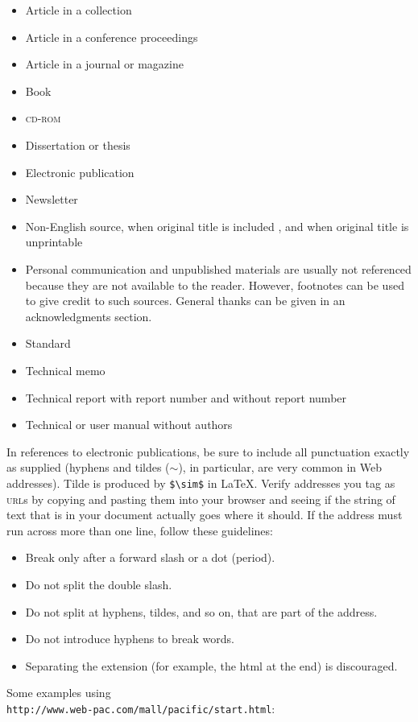 \begin{itemize}
\item
Article in a collection \cite{Albrecht81:PPIFTE}
\item
Article in a conference proceedings \cite{Weiser98:ICDE}
\item
Article in a journal or magazine \cite{SSS74:ACMCS}
\item
Book \cite{Arbib98,NS79}
\item
\textsc{cd-rom} \cite{NS79:CDROM}
\item
Dissertation or thesis \cite{Fagin87:PhD,Nichols85:MS}
\item
Electronic publication \cite{Burka00:MUD}
\item
Newsletter \cite{Butler87:SDN}
\item
Non-English source, 
when original title is included \cite{ZS84},
and when original title is unprintable \cite{Nakayama95:NE}
\item
Personal communication and
                 unpublished materials
are usually not referenced because they are not
                 available to the reader. 
However, footnotes can be used to give credit to such sources.
General thanks can be given in an acknowledgments section.

\item
Standard \cite{IEEE15961992,BT60192}
\item
Technical memo \cite{IST83misc}
\item
Technical report with report number \cite{HH85:Cornell674}
and without report number \cite{Yarwood77:UToronto}
\item
Technical or user manual without authors \cite{UnixID86}
\end{itemize}

In references to electronic publications,
be sure to include all punctuation exactly as supplied (hyphens
and tildes ($\sim$), in particular, are very common in Web addresses).
Tilde is produced by \verb+$\sim$+ in \LaTeX.
Verify addresses you tag as \textsc{url}s by copying and pasting them
into your browser and seeing if the string of text that is in
your document actually goes where it should.
If the address must run across more than one line, follow these
guidelines:
   \begin{itemize}
   \item Break only after a forward slash or a dot (period). 
   \item Do not split the double slash. 
   \item Do not split at hyphens, tildes, and so on, 
         that are part of the address. 
   \item Do not introduce hyphens to break words. 
   \item Separating the extension (for example, the html at the
                    end) is discouraged. 
   \end{itemize}
Some examples using\\
\verb+http://www.web-pac.com/mall/pacific/start.html+:

